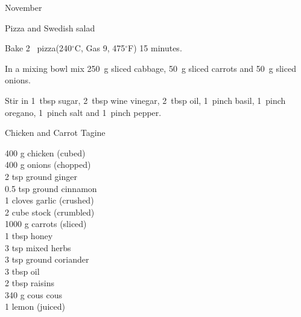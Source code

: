 \begin{menu}{November}
\begin{recipe}{1}{Pizza and Swedish salad}
\begin{ingredients}
		\end{ingredients}
	
	
	
    \begin{instructions}
    \item 
        Bake 2~  pizza(240$^{\circ}$C, Gas 9, 475$^{\circ}$F) 15 minutes.
      \item 
        In a mixing bowl mix
        250~g sliced cabbage,
        50~g sliced carrots
        and
        50~g sliced onions.
      \item 
        Stir in
        1~tbsp  sugar,
        2~tbsp  wine vinegar,
        2~tbsp  oil,
        1~pinch  basil,
        1~pinch  oregano,
        1~pinch  salt
        and
        1~pinch  pepper.
      
    \end{instructions}
    \end{recipe}%
  
    \begin{recipe}{2}{Chicken and Carrot Tagine}%
		\begin{ingredients}
		400 g chicken (cubed) \\
	400 g onions (chopped) \\
	2 tsp ground ginger  \\
	0.5 tsp ground cinnamon  \\
	1 cloves garlic (crushed) \\
	2 cube stock (crumbled) \\
	1000 g carrots (sliced) \\
	1 tbsp honey  \\
	3 tsp mixed herbs  \\
	3 tsp ground coriander  \\
	3 tbsp oil  \\
	2 tbsp raisins  \\
	340 g cous cous  \\
	1  lemon (juiced) \\
	
		\end{ingredients}
	
	

\end{recipe}
\end{menu}
